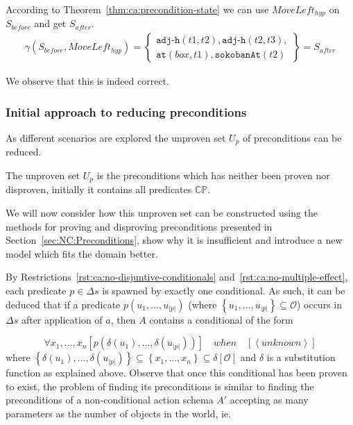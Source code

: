 \documentclass[../Master.tex]{subfiles}
\begin{document}
\begin{example}
    According to Theorem~\ref{thm:ca:precondition-state} we can use $MoveLeft_{hyp}$ on $S_{before}$ and get $S_{after}$.
    \begin{align*}
    &\gamma(S_{before},MoveLeft_{hyp}) =
        \left\{
            \begin{gathered}
                \texttt{adj-h}(t1, t2), \texttt{adj-h}(t2, t3), \\
                \texttt{at}(box,t1), \texttt{sokobanAt}(t2)
            \end{gathered}
        \right\}
        = S_{after}
    &
    \end{align*}

    We observe that this is indeed correct.
\end{example}

\subsubsection{Initial approach to reducing preconditions}

As different scenarios are explored the unproven set $U_p$ of preconditions can be reduced.

\begin{definition}
The unproven set $U_p$ is the preconditions which has neither been proven nor disproven, initially it contains all  predicates $\mathbb{CP}$.
\end{definition}

We will now consider how this unproven set can be constructed using the methods for proving and disproving preconditions presented in Section~\ref{sec:NC:Preconditions}, show why it is insufficient and introduce a new model which fits the domain better.

By Restrictions~\ref{rst:ca:no-disjuntive-conditionals} and~\ref{rst:ca:no-multiple-effect}, each predicate $p \in \Delta s$ is spawned by exactly one conditional. As such, it can be deduced that if a predicate $p\left(u_1, \dots, u_{|p|}\right)$ (where $\left\{u_1, \dots, u_{|p|}\right\} \subseteq \mathcal{O}$) occurs in $\Delta s$ after application of $a$, then $A$ contains a conditional of the form

\begin{equation*}
    \forall x_1, \dots, x_n 
        \left[ p\left(\delta\left(u_1\right), \dots, \delta \left(u_{|p|}\right) \right) \right] \quad when \quad 
        \left[ \left<unknown\right> \right]
\end{equation*}
where $\left\{\delta \left( u_1 \right), \dots, \delta \left(u_{|p|} \right) \right\} \subseteq \left\{ x_1, \dots, x_n \right\} \subseteq \delta [\mathcal{O}]$ and $\delta$ is a substitution function as explained above. Observe that once this conditional has been proven to exist, the problem of finding its preconditions is similar to finding the preconditions of a non-conditional action schema $A'$ accepting as many parameters as the number of objects in the world, ie. 
\end{document}
